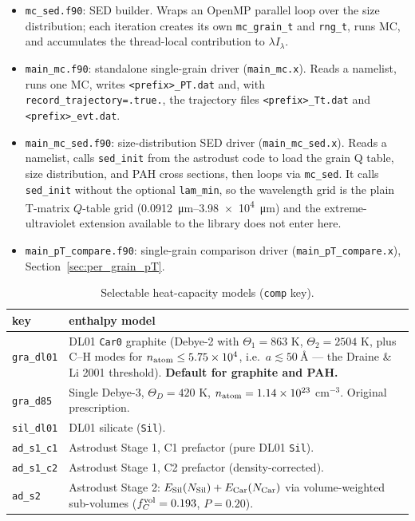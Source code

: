 \documentclass{my_memo}
\begin{document}
\begin{itemize}
\item \verb|mc_sed.f90|: SED builder.  Wraps an OpenMP parallel
  loop over the size distribution; each iteration creates its own
  \verb|mc_grain_t| and \verb|rng_t|, runs MC, and accumulates the
  thread-local contribution to $\lambda I_\lambda$.

\item \verb|main_mc.f90|: standalone single-grain driver
  (\verb|main_mc.x|).  Reads a namelist, runs one MC, writes
  \verb|<prefix>_PT.dat| and, with \verb|record_trajectory=.true.|,
  the trajectory files \verb|<prefix>_Tt.dat| and \verb|<prefix>_evt.dat|.

\item \verb|main_mc_sed.f90|: size-distribution SED driver
  (\verb|main_mc_sed.x|).  Reads a namelist, calls \verb|sed_init|
  from the astrodust code to load the grain Q table, size
  distribution, and PAH cross sections, then loops via \verb|mc_sed|.
  It calls \verb|sed_init| without the optional \verb|lam_min|, so the
  wavelength grid is the plain T-matrix $Q$-table grid
  (\SIrange{0.0912}{3.98e4}{\micro\meter}) and the extreme-ultraviolet
  extension available to the library does not enter here.

\item \verb|main_pT_compare.f90|: single-grain comparison driver
  (\verb|main_pT_compare.x|), Section~\ref{sec:per_grain_pT}.
\end{itemize}

\begin{table}[ht]
\centering
\caption{Selectable heat-capacity models (\texttt{comp} key).}
\label{tab:hc}
\begin{tabularx}{\linewidth}{lX}
\toprule
key & enthalpy model \\
\midrule
\texttt{gra\_dl01} & DL01 \texttt{Car0} graphite (Debye-2 with $\Theta_1=863$ K, $\Theta_2=2504$ K, plus C--H modes for $n_{\rm atom}\le5.75\times10^4$, i.e.\ $a\lesssim\SI{50}{\angstrom}$ --- the Draine \& Li 2001 threshold).  \textbf{Default for graphite and PAH.} \\
\texttt{gra\_d85}  & Single Debye-3, $\Theta_D=420$ K, $n_{\rm atom}=1.14\times10^{23}$ cm$^{-3}$.  Original \citet{DraineAnderson1985} prescription. \\
\texttt{sil\_dl01} & DL01 silicate (\texttt{Sil}). \\
\texttt{ad\_s1\_c1} & Astrodust Stage 1, C1 prefactor (pure DL01 \texttt{Sil}). \\
\texttt{ad\_s1\_c2} & Astrodust Stage 1, C2 prefactor (density-corrected). \\
\texttt{ad\_s2}    & Astrodust Stage 2: $E_{\rm Sil}(N_{\rm Sil})+E_{\rm Car}(N_{\rm Car})$ via volume-weighted sub-volumes ($f_C^{\rm vol}=0.193$, $P=0.20$). \\
\bottomrule
\end{tabularx}
\end{table}
\end{document}
